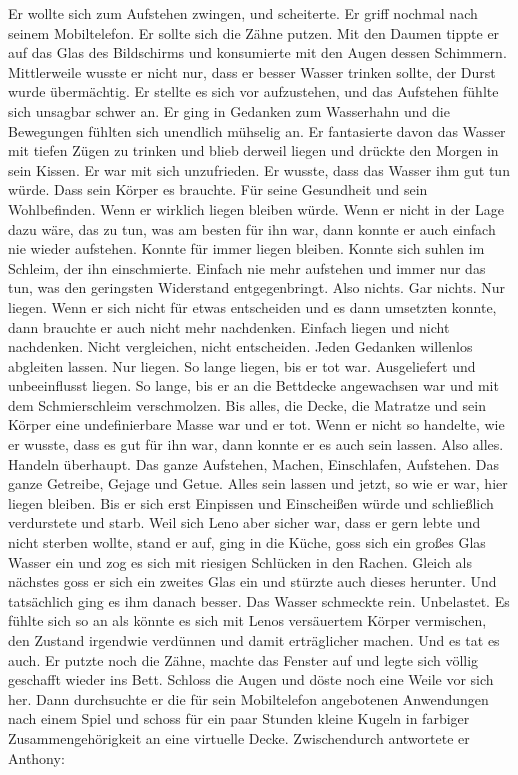 \documentclass[ngerman,smalldemyvopaper,11pt,oneside,onecolumn,openright,extrafontsizes]{memoir}
\begin{document}
Er wollte sich zum Aufstehen zwingen, und scheiterte. Er griff nochmal nach seinem Mobiltelefon. Er sollte sich die Zähne putzen. Mit den Daumen tippte er auf das Glas des Bildschirms und konsumierte mit den Augen dessen Schimmern. Mittlerweile wusste er nicht nur, dass er besser Wasser trinken sollte, der Durst wurde übermächtig. Er stellte es sich vor aufzustehen, und das Aufstehen fühlte sich unsagbar schwer an. Er ging in Gedanken zum Wasserhahn und die Bewegungen fühlten sich unendlich mühselig an. Er fantasierte davon das Wasser mit tiefen Zügen zu trinken und blieb derweil liegen und drückte den Morgen in sein Kissen. Er war mit sich unzufrieden. Er wusste, dass das Wasser ihm gut tun würde. Dass sein Körper es brauchte. Für seine Gesundheit und sein Wohlbefinden. Wenn er wirklich liegen bleiben würde. Wenn er nicht in der Lage dazu wäre, das zu tun, was am besten für ihn war, dann konnte er auch einfach nie wieder aufstehen. Konnte für immer liegen bleiben. Konnte sich suhlen im Schleim, der ihn einschmierte. Einfach nie mehr aufstehen und immer nur das tun, was den geringsten Widerstand entgegenbringt. Also nichts. Gar nichts. Nur liegen. Wenn er sich nicht für etwas entscheiden und es dann umsetzten konnte, dann brauchte er auch nicht mehr nachdenken. Einfach liegen und nicht nachdenken. Nicht vergleichen, nicht entscheiden. Jeden Gedanken willenlos abgleiten lassen. Nur liegen. So lange liegen, bis er tot war. Ausgeliefert und unbeeinflusst liegen. So lange, bis er an die Bettdecke angewachsen war und mit dem Schmierschleim verschmolzen. Bis alles, die Decke, die Matratze und sein Körper eine undefinierbare Masse war und er tot. Wenn er nicht so handelte, wie er wusste, dass es gut für ihn war, dann konnte er es auch sein lassen. Also alles. Handeln überhaupt. Das ganze Aufstehen, Machen, Einschlafen, Aufstehen. Das ganze Getreibe, Gejage und Getue. Alles sein lassen und jetzt, so wie er war, hier liegen bleiben. Bis er sich erst Einpissen und Einscheißen würde und schließlich verdurstete und starb. Weil sich Leno aber sicher war, dass er gern lebte und nicht sterben wollte, stand er auf, ging in die Küche, goss sich ein großes Glas Wasser ein und zog es sich mit riesigen Schlücken in den Rachen. Gleich als nächstes goss er sich ein zweites Glas ein und stürzte auch dieses herunter. Und tatsächlich ging es ihm danach besser. Das Wasser schmeckte rein. Unbelastet. Es fühlte sich so an als könnte es sich mit Lenos versäuertem Körper vermischen, den Zustand irgendwie verdünnen und damit erträglicher machen. Und es tat es auch. Er putzte noch die Zähne, machte das Fenster auf und legte sich völlig geschafft wieder ins Bett. Schloss die Augen und döste noch eine Weile vor sich her. Dann durchsuchte er die für sein Mobiltelefon angebotenen Anwendungen nach einem Spiel und schoss für ein paar Stunden kleine Kugeln in farbiger Zusammengehörigkeit an eine virtuelle Decke. Zwischendurch antwortete er Anthony:
\end{document}
